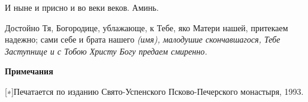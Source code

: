    И ныне и присно и во веки веков. Аминь.



   Достойно Тя, Богородице, ублажающе, к Тебе, яко Матери нашей,
притекаем надежно; сами себе и брата нашего \itshape  (имя)\normalfont{}, малодушие
скончавшагося, Тебе Заступнице и с Тобою Христу Богу предаем
смиренно.

   


 

\bfseries Примечания\normalfont{}


[∗]Печатается по изданию Свято-Успенского Псково-Печерского монастыря, 1993.


\mychapterending

 


